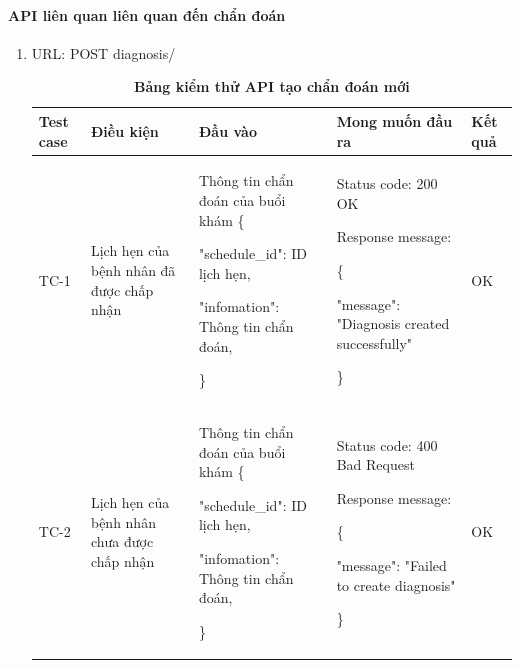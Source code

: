 \paragraph{API liên quan liên quan đến chẩn đoán}
\mbox{}
\begin{enumerate}
  \item URL: POST diagnosis/
    \begin{xltabular}{\textwidth}{
    | >{\raggedright\arraybackslash}p{1cm}
    | >{\raggedright\arraybackslash}p{2.5cm}
    | >{\raggedright\arraybackslash}X
    | >{\raggedright\arraybackslash}X
    | >{\raggedright\arraybackslash}p{1cm}|
    }
    \caption{\bfseries \fontsize{12pt}{0pt}\selectfont Bảng kiểm thử API tạo chẩn đoán mới}
    \\
    \hline
    \bfseries Test case    &\bfseries Điều kiện   &\bfseries Đầu vào 
    &\bfseries Mong muốn đầu ra &\bfseries Kết quả\\ \hline
  
  
    TC-1
    & Lịch hẹn của bệnh nhân đã được chấp nhận
    & Thông tin chẩn đoán của buổi khám
    \{

    "schedule\_id": ID lịch hẹn,

    "infomation": Thông tin chẩn đoán,

   \}
    & 
  
    Status code: 200 OK
  
      Response message:
  
      \{

    "message": "Diagnosis created successfully"
  
    \}
    
    & OK
  
    \\ \hline

    TC-2
    & Lịch hẹn của bệnh nhân chưa được chấp nhận
    & Thông tin chẩn đoán của buổi khám
    \{

    "schedule\_id": ID lịch hẹn,

    "infomation": Thông tin chẩn đoán,

   \}
    & 
  
    Status code: 400 Bad Request
  
      Response message:
  
      \{

    "message": "Failed to create diagnosis"
  
    \}
    
    & OK
  
    \\ \hline
  

\end{xltabular}
\end{enumerate}
